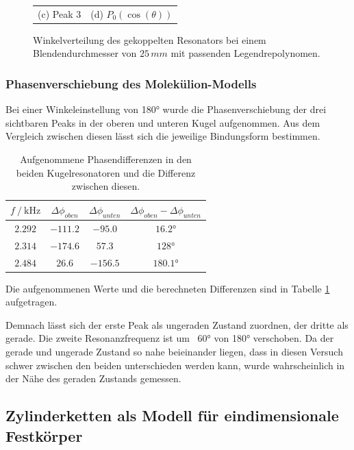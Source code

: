 \begin{figure}[H]
\begin{tabular}{cc}
  (c)  Peak 3 & (d)  $P_0(\cos(\theta))$ \\[6pt]
  \end{tabular}
  \caption{Winkelverteilung des gekoppelten Resonators bei einem Blendendurchmesser von $25\, mm$ mit passenden Legendrepolynomen.} 
  \label{fig:h2_2}
\end{figure}

\subsubsection{Phasenverschiebung des Molekülion-Modells}

Bei einer Winkeleinstellung von 180° wurde die Phasenverschiebung der drei sichtbaren Peaks in der oberen und unteren Kugel aufgenommen. Aus dem Vergleich zwischen diesen lässt sich die jeweilige Bindungsform bestimmen. 
\begin{table}[H]
  \centering
\begin{tabular}{c|c|c|c}
  $f \:/\: \si{\kilo\hertz}$ & $\Delta\phi_{oben}$ & $\Delta\phi_{unten}$ &  $\Delta\phi_{oben}-\Delta\phi_{unten}$ \\ \hline
  $2.292$ & $-111.2$ & $-95.0$ & $16.2°$ \\
  $2.314$ & $-174.6$ & $57.3$ & $128°$ \\
  $2.484$ & $26.6$ & $-156.5$ &  $180.1°$ \\
\end{tabular}
\caption{Aufgenommene Phasendifferenzen in den beiden Kugelresonatoren und die Differenz zwischen diesen.} 
\label{tab:phasen}
\end{table}
Die aufgenommenen Werte und die berechneten Differenzen sind in Tabelle \ref{tab:phasen} aufgetragen.

Demnach lässt sich der erste Peak als ungeraden Zustand zuordnen, der dritte als gerade. 
Die zweite Resonanzfrequenz ist um ~60° von 180° verschoben. Da der gerade und ungerade Zustand so nahe beieinander liegen, dass in diesen Versuch schwer zwischen den beiden unterschieden werden kann, wurde wahrscheinlich in der Nähe des geraden Zustands gemessen.


\subsection{Zylinderketten als Modell für eindimensionale Festkörper}
